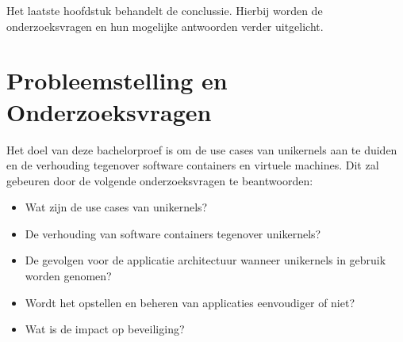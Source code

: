 Het laatste hoofdstuk behandelt de conclussie. Hierbij worden de onderzoeksvragen en hun mogelijke antwoorden verder uitgelicht.

\section{Probleemstelling en Onderzoeksvragen}
\label{sec:onderzoeksvragen}

Het doel van deze bachelorproef is om de use cases van unikernels aan te duiden en de verhouding tegenover software containers en virtuele machines. 
Dit zal gebeuren door de volgende onderzoeksvragen te beantwoorden:

\begin{itemize}  
\item Wat zijn de use cases van unikernels?
\item De verhouding van software containers tegenover unikernels?
\item De gevolgen voor de applicatie architectuur wanneer unikernels in gebruik worden genomen?
\item Wordt het opstellen en beheren van applicaties eenvoudiger of niet?
\item Wat is de impact op beveiliging?
\end{itemize}
